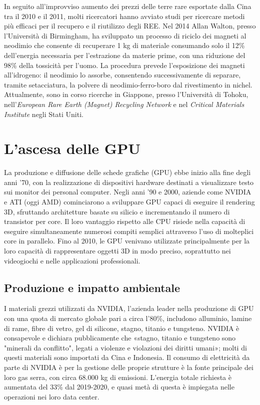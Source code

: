 \documentclass[12pt,a4paper,oneside]{book}
\begin{document}
In seguito all'improvviso aumento dei prezzi delle terre rare esportate dalla Cina tra il 2010 e il 2011, molti ricercatori hanno avviato studi per ricercare metodi più efficaci per il recupero e il riutilizzo degli REE.
Nel 2014 Allan Walton, presso l’Università di Birmingham, ha sviluppato un processo di riciclo dei magneti al neodimio che consente di recuperare 1 kg di materiale consumando solo il 12\% dell’energia necessaria per l’estrazione da materie prime, con una riduzione del 98\% della tossicità per l’uomo. La procedura prevede l'esposizione dei magneti all’idrogeno: il neodimio lo assorbe, consentendo successivamente di separare, tramite setacciatura, la polvere di neodimio-ferro-boro dal rivestimento in nichel.
Attualmente, sono in corso ricerche in Giappone, presso l'Università di Tohoku, nell'\textit{European Rare Earth (Magnet) Recycling Network} e nel \textit{Critical Materials Institute} negli Stati Uniti.

\chapter{L'ascesa delle GPU}
La produzione e diffusione delle schede grafiche (GPU) ebbe inizio alla fine degli anni '70, con la realizzazione di dispositivi hardware destinati a visualizzare testo sui monitor dei personal computer. Negli anni '90 e 2000, aziende come NVIDIA e ATI (oggi AMD) cominciarono a sviluppare GPU capaci di eseguire il rendering 3D, sfruttando architetture basate su silicio e incrementando il numero di transistor per core. Il loro vantaggio rispetto alle CPU risiede nella capacità di eseguire simultaneamente numerosi compiti semplici attraverso l'uso di molteplici core in parallelo. Fino al 2010, le GPU venivano utilizzate principalmente per la loro capacità di rappresentare oggetti 3D in modo preciso, soprattutto nei videogiochi e nelle applicazioni professionali.

\section{Produzione e impatto ambientale}

I materiali grezzi utilizzati da NVIDIA, l'azienda leader nella produzione di GPU con una quota di mercato globale pari a circa l’80\%, includono alluminio, lamine di rame, fibre di vetro, gel di silicone, stagno, titanio e tungsteno. NVIDIA è consapevole e dichiara pubblicamente che «stagno, titanio e tungsteno sono "minerali da conflitto"\citep[p.12]{nvidia2021report}, legati a violenze e violazioni dei diritti umani»; molti di questi materiali sono importati da Cina e Indonesia.
Il consumo di elettricità da parte di NVIDIA è per la gestione delle proprie strutture è la fonte principale dei loro gas serra, con circa 68.000 kg di emissioni. L'energia totale richiesta è aumentata del 33\% dal 2019-2020, e quasi metà di questa è impiegata nelle operazioni nei loro data center.
\end{document}
